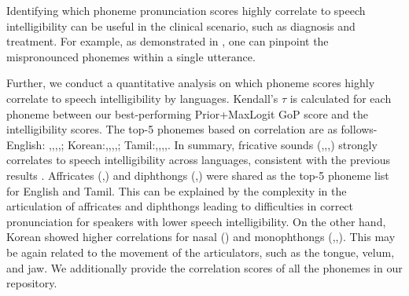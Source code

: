 

Identifying which phoneme pronunciation scores highly correlate to speech intelligibility can be useful in the clinical scenario, such as diagnosis and treatment.
For example, as demonstrated in , one can pinpoint the mispronounced phonemes within a single utterance.


Further, we conduct a quantitative analysis on which phoneme scores highly correlate to speech intelligibility by languages.
Kendall's $\tau$ is calculated for each phoneme between our best-performing Prior+MaxLogit GoP score and the intelligibility scores.
The top-5 phonemes based on correlation are as follows- English: ,\textipa{/\textesh/},,,\textipa{/\textdyoghlig/}; Korean:,,,,\textipa{/\textturnv/}; Tamil:\textipa{/\textrtails/},,\textipa{/\textteshlig/},,.
In summary, fricative sounds (,\textipa{/\textrtails/},\textipa{/\textesh/},) strongly correlates to speech intelligibility across languages, consistent with the previous results \cite{hernandez2019acoustic}.
Affricates (\textipa{/\textteshlig/},\textipa{/\textdyoghlig/}) and diphthongs (,) were shared as the top-5 phoneme list for English and Tamil.
This can be explained by the complexity in the articulation of affricates and diphthongs leading to difficulties in correct pronunciation for speakers with lower speech intelligibility.
On the other hand, Korean showed higher correlations for nasal () and monophthongs (,,\textipa{/\textturnv/}).
This may be again related to the movement of the articulators, such as the tongue, velum, and jaw.
We additionally provide the correlation scores of all the phonemes in our repository.

